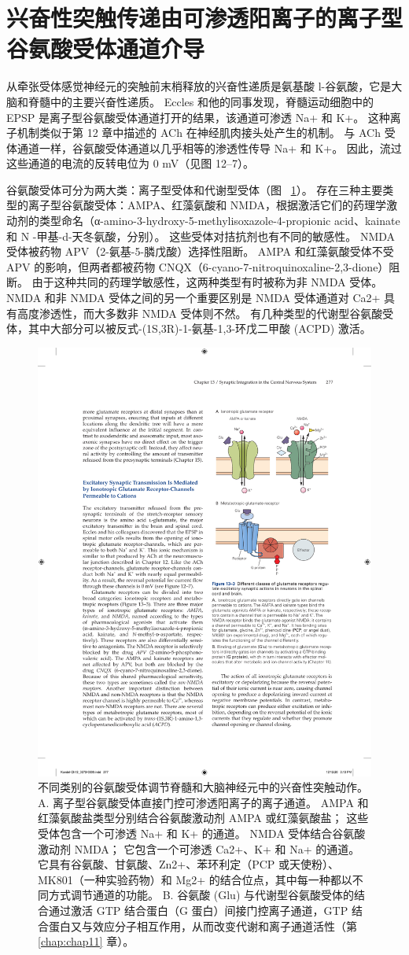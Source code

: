 \section{兴奋性突触传递由可渗透阳离子的离子型谷氨酸受体通道介导}

从牵张受体感觉神经元的突触前末梢释放的兴奋性递质是氨基酸 l-谷氨酸，它是大脑和脊髓中的主要兴奋性递质。
Eccles 和他的同事发现，脊髓运动细胞中的 EPSP 是离子型谷氨酸受体通道打开的结果，该通道可渗透 Na+ 和 K+。
这种离子机制类似于第 12 章中描述的 ACh 在神经肌肉接头处产生的机制。
与 ACh 受体通道一样，谷氨酸受体通道以几乎相等的渗透性传导 Na+ 和 K+。 因此，流过这些通道的电流的反转电位为 0 mV（见图 12–7）。


谷氨酸受体可分为两大类：离子型受体和代谢型受体（图 ~\ref{fig:13_3}）。 
存在三种主要类型的离子型谷氨酸受体：AMPA、红藻氨酸和 NMDA，根据激活它们的药理学激动剂的类型命名（α-amino-3-hydroxy-5-methylisoxazole-4-propionic acid、kainate 和 N -甲基-d-天冬氨酸，分别）。
这些受体对拮抗剂也有不同的敏感性。
NMDA 受体被药物 APV（2-氨基-5-膦戊酸）选择性阻断。
AMPA 和红藻氨酸受体不受 APV 的影响，但两者都被药物 CNQX（6-cyano-7-nitroquinoxaline-2,3-dione）阻断。
由于这种共同的药理学敏感性，这两种类型有时被称为非 NMDA 受体。
NMDA 和非 NMDA 受体之间的另一个重要区别是 NMDA 受体通道对 Ca2+ 具有高度渗透性，而大多数非 NMDA 受体则不然。
有几种类型的代谢型谷氨酸受体，其中大部分可以被反式-(1S,3R)-1-氨基-1,3-环戊二甲酸 (ACPD) 激活。


\begin{figure}[htbp]
	\centering
	\includegraphics[width=0.5\linewidth]{chap13/fig_13_3}
	\caption{不同类别的谷氨酸受体调节脊髓和大脑神经元中的兴奋性突触动作。 A. 离子型谷氨酸受体直接门控可渗透阳离子的离子通道。 AMPA 和红藻氨酸盐类型分别结合谷氨酸激动剂 AMPA 或红藻氨酸盐； 这些受体包含一个可渗透 Na+ 和 K+ 的通道。 NMDA 受体结合谷氨酸激动剂 NMDA； 它包含一个可渗透 Ca2+、K+ 和 Na+ 的通道。 它具有谷氨酸、甘氨酸、Zn2+、苯环利定（PCP 或天使粉）、MK801（一种实验药物）和 Mg2+ 的结合位点，其中每一种都以不同方式调节通道的功能。 B. 谷氨酸 (Glu) 与代谢型谷氨酸受体的结合通过激活 GTP 结合蛋白（G 蛋白）间接门控离子通道，GTP 结合蛋白又与效应分子相互作用，从而改变代谢和离子通道活性（第 \ref{chap:chap11} 章）。}
	\label{fig:13_3}
\end{figure}



